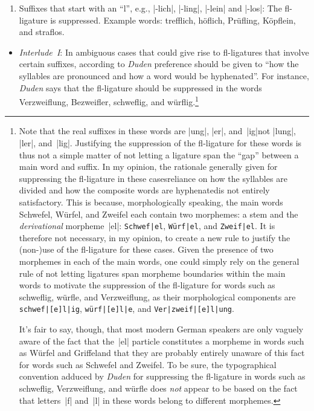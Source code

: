 \documentclass[11pt]{article}
\begin{document}
\begin{enumerate}
\begin{enumerate}
\item Suffixes that start with an \enquote{l}, e.g., |-lich|, |-ling|, |-lein| and |-los|: The fl-ligature is suppressed. Example words: trefflich, höflich, Prüfling, Köpflein, and s\breaklig traflos. 

\end{enumerate}

\begin{itemize}
\item
\emph{Interlude~I}: In ambiguous cases that could give rise to fl-ligatures that involve certain suffixes, according to \emph{Duden} preference should be given to \enquote{how the syllables are pronounced and how a word would be hyphenated}. For instance, \emph{Duden} says that the fl-ligature should be suppressed in the words Verzweiflung, Bezweifler, schweflig, and würflig.\footnote{%
Note that the real suffixes in these words are |ung|, |er|, and~|ig|\textemdash not |lung|, |ler|, and~|lig|. Justifying the suppression of the fl-ligature for these words is thus not a simple matter of not letting a ligature span the \enquote{gap} between a main word and suffix.
In my opinion, the rationale generally given for suppressing the fl-ligature in these cases\textemdash reliance on how the syllables are divided and how the composite words are hyphenated\textemdash is not entirely satisfactory. This is because, morphologically speaking, the main words Schwefel, Würfel, and Zweifel each contain two morphemes: a stem and the \emph{derivational} morpheme~|el|: \Verb+Schwef|el+, \Verb+Würf|el+, and \Verb+Zweif|el+. It is therefore not necessary, in my opinion, to create a new rule to justify the (non-)use of the fl-ligature for these cases. Given the presence of two morphemes in each of the main words, one could  simply rely on the general rule of not letting ligatures span morpheme boundaries within the main words to motivate the suppression of the fl-ligature for words such as schweflig, würfle, and Verzweiflung, as their morphological components are \Verb+schwef|[e]l|ig+, \Verb+würf|[e]l|e+, and \Verb+Ver|zweif|[e]l|ung+. 

It's fair to say, though, that most modern German speakers are only vaguely aware of the fact that the~|el| particle constitutes a morpheme in words such as Würfel and Griffel\textemdash and that they are probably entirely unaware of this fact for words such as Schwefel and Zweifel. To be sure, the typographical convention adduced by \emph{Duden} for suppressing the fl-ligature in words such as schweflig, Verzweiflung, and würfle does \emph{not} appear to be based on the fact that letters~|f| and~|l| in these words belong to different morphemes.}


\end{itemize}
\end{enumerate}
\end{document}

